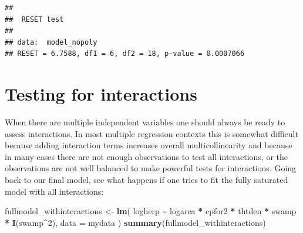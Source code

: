 \documentclass[
  12pt,
]{book}
\newenvironment{Shaded}{\begin{snugshade}}{\end{snugshade}}
\newcommand{\DataTypeTok}[1]{\textcolor[rgb]{0.13,0.29,0.53}{#1}}
\newcommand{\DecValTok}[1]{\textcolor[rgb]{0.00,0.00,0.81}{#1}}
\newcommand{\KeywordTok}[1]{\textcolor[rgb]{0.13,0.29,0.53}{\textbf{#1}}}
\newcommand{\NormalTok}[1]{#1}
\newcommand{\OperatorTok}[1]{\textcolor[rgb]{0.81,0.36,0.00}{\textbf{#1}}}
\newcommand{\StringTok}[1]{\textcolor[rgb]{0.31,0.60,0.02}{#1}}
\begin{document}
\begin{verbatim}
## 
##  RESET test
## 
## data:  model_nopoly
## RESET = 6.7588, df1 = 6, df2 = 18, p-value = 0.0007066
\end{verbatim}

\hypertarget{testing-for-interactions}{%
\section{Testing for interactions}\label{testing-for-interactions}}

When there are multiple independent variables one should always be ready to assess interactions. In most multiple regression contexts this is somewhat difficult because adding interaction terms increases overall multicollinearity and because in many cases there are not enough observations to test all interactions, or the observations are not well balanced to make powerful tests for interactions. Going back to our final model, see what happens if one tries to fit the fully saturated model with all interactions:

\begin{Shaded}
\begin{Highlighting}[]
\NormalTok{fullmodel\_withinteractions \textless{}{-}}\StringTok{ }\KeywordTok{lm}\NormalTok{(}
\NormalTok{  logherp }\OperatorTok{\textasciitilde{}}\StringTok{ }\NormalTok{logarea }\OperatorTok{*}\StringTok{ }\NormalTok{cpfor2 }\OperatorTok{*}\StringTok{ }\NormalTok{thtden }\OperatorTok{*}\StringTok{ }\NormalTok{swamp }\OperatorTok{*}\StringTok{ }\KeywordTok{I}\NormalTok{(swamp}\OperatorTok{\^{}}\DecValTok{2}\NormalTok{),}
  \DataTypeTok{data =}\NormalTok{ mydata}
\NormalTok{)}
\KeywordTok{summary}\NormalTok{(fullmodel\_withinteractions)}
\end{Highlighting}
\end{Shaded}
\end{document}
